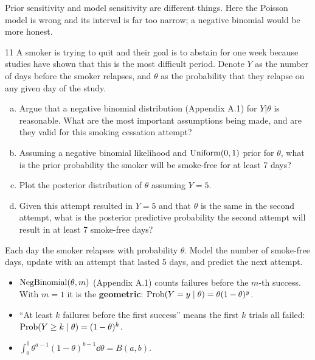 \documentclass[11pt]{article}
\begin{document}
\begin{takeaway}
Prior sensitivity and model sensitivity are different things. Here the Poisson model is wrong and its interval is far too narrow; a negative binomial would be more honest.
\end{takeaway}


\begin{problem}{11}
A smoker is trying to quit and their goal is to abstain for one week because studies have shown that this is the most difficult period. Denote $Y$ as the number of days before the smoker relapses, and $\theta$ as the probability that they relapse on any given day of the study.
\begin{enumerate}[(a)]
\item Argue that a negative binomial distribution (Appendix A.1) for $Y|\theta$ is reasonable. What are the most important assumptions being made, and are they valid for this smoking cessation attempt?
\item Assuming a negative binomial likelihood and $\mathrm{Uniform}(0,1)$ prior for $\theta$, what is the prior probability the smoker will be smoke-free for at least 7 days?
\item Plot the posterior distribution of $\theta$ assuming $Y=5$.
\item Given this attempt resulted in $Y=5$ and that $\theta$ is the same in the second attempt, what is the posterior predictive probability the second attempt will result in at least 7 smoke-free days?
\end{enumerate}
\end{problem}

\begin{restate}
Each day the smoker relapses with probability $\theta$. Model the number of smoke-free days, update with an attempt that lasted 5 days, and predict the next attempt.
\end{restate}

\begin{recall}
\begin{itemize}
\item $\mathrm{NegBinomial}(\theta,m)$ (Appendix A.1) counts failures before the $m$-th success. With $m=1$ it is the \textbf{geometric}: $\mathrm{Prob}(Y=y\mid\theta)=\theta(1-\theta)^y$.
\item ``At least $k$ failures before the first success'' means the first $k$ trials all failed: $\mathrm{Prob}(Y\ge k\mid\theta)=(1-\theta)^k$.
\item $\int_0^1\theta^{a-1}(1-\theta)^{b-1}\dd\theta=B(a,b)$.
\end{itemize}
\end{recall}
\end{document}
